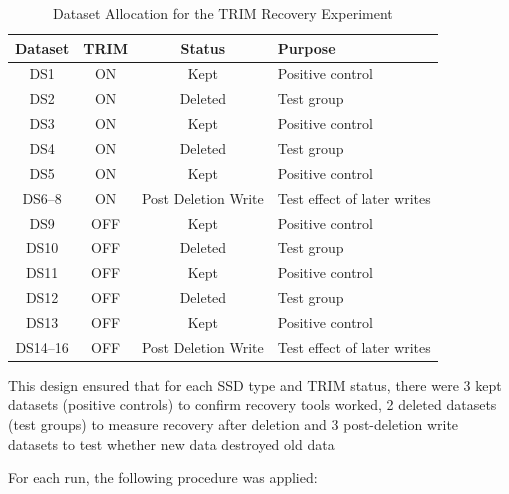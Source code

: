\begin{table}[H]
    \centering
    \caption{Dataset Allocation for the TRIM Recovery Experiment}
    \label{tab:dataset-trim}
    \begin{tabular}{c c c l}
        \toprule
        \textbf{Dataset} & \textbf{TRIM} & \textbf{Status} & \textbf{Purpose} \\
        \midrule
        DS1      & ON  & Kept        & Positive control \\
        DS2      & ON  & Deleted     & Test group \\
        DS3      & ON  & Kept        & Positive control \\
        DS4      & ON  & Deleted     & Test group \\
        DS5      & ON  & Kept        & Positive control \\
        DS6--8   & ON  & Post Deletion Write & Test effect of later writes \\
        DS9      & OFF & Kept        & Positive control \\
        DS10     & OFF & Deleted     & Test group \\
        DS11     & OFF & Kept        & Positive control \\
        DS12     & OFF & Deleted     & Test group \\
        DS13     & OFF & Kept        & Positive control \\
        DS14--16 & OFF & Post Deletion Write & Test effect of later writes \\
        \bottomrule
    \end{tabular}
\end{table}

This design ensured that for each SSD type and TRIM status, there were 3 kept datasets (positive controls) to confirm recovery tools worked, 2 deleted datasets (test 
groups) to measure recovery after deletion and 3 post-deletion write datasets to test whether new data destroyed old data

For each run, the following procedure was applied:

